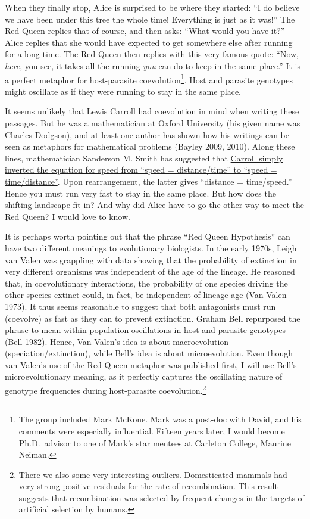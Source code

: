\documentclass[
  letterpaper,
]{book}
\begin{document}
When they finally stop, Alice is surprised to be where they started: ``I
do believe we have been under this tree the whole time! Everything is
just as it was!'' The Red Queen replies that of course, and then asks:
``What would you have it?'' Alice replies that she would have expected
to get somewhere else after running for a long time. The Red Queen then
replies with this very famous quote: ``Now, \emph{here}, you see, it
takes all the running \emph{you} can do to keep in the same place.'' It
is a perfect metaphor for host-parasite coevolution\footnote{The group
  included Mark McKone. Mark was a post-doc with David, and his comments
  were especially influential. Fifteen years later, I would become
  Ph.D.~advisor to one of Mark's star mentees at Carleton College,
  Maurine Neiman.}. Host and parasite genotypes might oscillate as if
they were running to stay in the same place.

It seems unlikely that Lewis Carroll had coevolution in mind when
writing these passages. But he was a mathematician at Oxford University
(his given name was Charles Dodgson), and at least one author has shown
how his writings can be seen as metaphors for mathematical problems
(Bayley 2009, 2010). Along these lines, mathematician Sanderson M. Smith
has suggested that
\href{http://www.herkimershideaway.org/writings/carroll.htm}{Carroll
simply inverted the equation for speed from ``speed = distance/time'' to
``speed = time/distance''}. Upon rearrangement, the latter gives
``distance = time/speed.'' Hence you must run very fast to stay in the
same place. But how does the shifting landscape fit in? And why did
Alice have to go the other way to meet the Red Queen? I would love to
know.

It is perhaps worth pointing out that the phrase ``Red Queen
Hypothesis'' can have two different meanings to evolutionary biologists.
In the early 1970s, Leigh van Valen was grappling with data showing that
the probability of extinction in very different organisms was
independent of the age of the lineage. He reasoned that, in
coevolutionary interactions, the probability of one species driving the
other species extinct could, in fact, be independent of lineage age (Van
Valen 1973). It thus seems reasonable to suggest that both antagonists
must run (coevolve) as fast as they can to prevent extinction. Graham
Bell repurposed the phrase to mean within-population oscillations in
host and parasite genotypes (Bell 1982). Hence, Van Valen's idea is
about macroevolution (speciation/extinction), while Bell's idea is about
microevolution. Even though van Valen's use of the Red Queen metaphor
was published first, I will use Bell's microevolutionary meaning, as it
perfectly captures the oscillating nature of genotype frequencies during
host-parasite coevolution.\footnote{There we also some very interesting
  outliers. Domesticated mammals had very strong positive residuals for
  the rate of recombination. This result suggests that recombination was
  selected by frequent changes in the targets of artificial selection by
  humans.}
\end{document}
